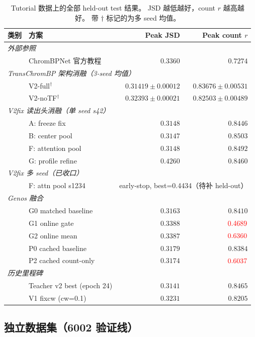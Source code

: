 \documentclass[11pt,a4paper]{ctexart}
\newcommand{\bad}[1]{\textcolor{red}{#1}}
\begin{document}
\begin{table}[H]
\centering
\small
\caption{Tutorial 数据上的全部 held-out test 结果。
JSD 越低越好，count $r$ 越高越好。
带 $\dag$ 标记的为多 seed 均值。}
\label{tab:tutorial-all}
\begin{tabular}{llrr}
\toprule
类别 & 方案 & Peak JSD & Peak count $r$ \\
\midrule
\multicolumn{4}{l}{\textit{外部参照}} \\
& ChromBPNet 官方教程 & $0.3360$ & $0.7274$ \\
\midrule
\multicolumn{4}{l}{\textit{TransChromBP 架构消融（3-seed 均值）}} \\
& V2-full$^\dag$ & $0.31419 \pm 0.00012$ & $0.83676 \pm 0.00531$ \\
& V2-noTF$^\dag$ & $0.32393 \pm 0.00021$ & $0.82503 \pm 0.00489$ \\
\midrule
\multicolumn{4}{l}{\textit{V2fix 读出头消融（单 seed s42）}} \\
& A: freeze fix & $0.3148$ & $0.8446$ \\
& B: center pool & $0.3147$ & $\mathbf{0.8503}$ \\
& F: attention pool & $0.3148$ & $0.8492$ \\
& G: profile refine & $0.4260$ & $0.8460$ \\
\midrule
\multicolumn{4}{l}{\textit{V2fix 多 seed（已收口）}} \\
& F: attn pool s1234 & \multicolumn{2}{c}{early-stop, best=0.4434（待补 held-out）} \\
\midrule
\multicolumn{4}{l}{\textit{Genos 融合}} \\
& G0 matched baseline & $0.3163$ & $0.8410$ \\
& G1 online gate & $0.3388$ & $\bad{0.4689}$ \\
& G2 online mean & $0.3387$ & $\bad{0.6360}$ \\
& P0 cached baseline & $0.3179$ & $0.8384$ \\
& P2 cached count-only & $0.3174$ & $\bad{0.6037}$ \\
\midrule
\multicolumn{4}{l}{\textit{历史里程碑}} \\
& Teacher v2 best (epoch 24) & $\mathbf{0.3141}$ & $\mathbf{0.8465}$ \\
& V1 fixcw (cw=0.1) & $0.3231$ & $0.8205$ \\
\bottomrule
\end{tabular}
\end{table}

\subsection{独立数据集（6002 验证线）}
\end{document}
